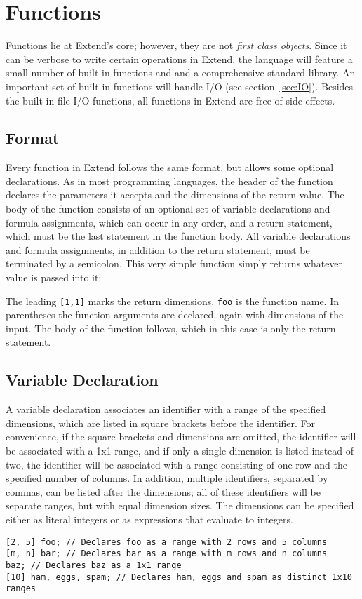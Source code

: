 \section{Functions}
Functions lie at Extend's core; however, they are not \textit{first class objects}. Since it can be verbose to write certain operations in Extend, the language will feature a small number of built-in functions and and a comprehensive standard library. An important set of built-in functions will handle I/O (see section~\ref{sec:IO}). Besides the built-in file I/O functions, all functions in Extend are free of side effects.
\subsection{Format}
Every function in Extend follows the same format, but allows some optional declarations. As in most programming languages, the header of the function declares the parameters it accepts and the dimensions of the return value. The body of the function consists of an optional set of variable declarations and formula assignments, which can occur in any order, and a return statement, which must be the last statement in the function body. All variable declarations and formula assignments, in addition to the return statement, must be terminated by a semicolon.
This very simple function simply returns whatever value is passed into it:

The leading \texttt{[1,1]} marks the return dimensions. \texttt{foo} is the function name. In parentheses the function arguments are declared, again with dimensions of the input. The body of the function follows, which in this case is only the return statement.
\subsection{Variable Declaration}
A variable declaration associates an identifier with a range of the specified dimensions, which are listed in square brackets before the identifier. For convenience, if the square brackets and dimensions are omitted, the identifier will be associated with a 1x1 range, and if only a single dimension is listed instead of two, the identifier will be associated with a range consisting of one row and the specified number of columns. In addition, multiple identifiers, separated by commas, can be listed after the dimensions; all of these identifiers will be separate ranges, but with equal dimension sizes. The dimensions can be specified either as literal integers or as expressions that evaluate to integers. 
\begin{lstlisting}
[2, 5] foo; // Declares foo as a range with 2 rows and 5 columns
[m, n] bar; // Declares bar as a range with m rows and n columns
baz; // Declares baz as a 1x1 range
[10] ham, eggs, spam; // Declares ham, eggs and spam as distinct 1x10 ranges
\end{lstlisting}
